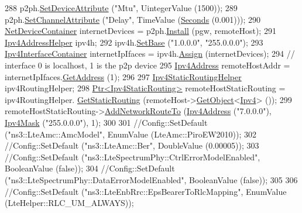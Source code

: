\begin{DoxyCode}
288   p2ph.\hyperlink{classns3_1_1PointToPointHelper_a4577f5ab8c387e5528af2e0fbab1152e}{SetDeviceAttribute} (\textcolor{stringliteral}{"Mtu"}, UintegerValue (1500));
289   p2ph.\hyperlink{classns3_1_1PointToPointHelper_a6b5317fd17fb61e5a53f8d66a90b63b9}{SetChannelAttribute} (\textcolor{stringliteral}{"Delay"}, TimeValue (\hyperlink{group__timecivil_ga33c34b816f8ff6628e33d5c8e9713b9e}{Seconds} (0.001)));
290   \hyperlink{classns3_1_1NetDeviceContainer}{NetDeviceContainer} internetDevices = p2ph.\hyperlink{classns3_1_1PointToPointHelper_ab9162fea3e88722666fed1106df1f9ec}{Install} (pgw, remoteHost);
291   \hyperlink{classns3_1_1Ipv4AddressHelper}{Ipv4AddressHelper} ipv4h;
292   ipv4h.\hyperlink{classns3_1_1Ipv4AddressHelper_acf7b16dd25bac67e00f5e25f90a9a035}{SetBase} (\textcolor{stringliteral}{"1.0.0.0"}, \textcolor{stringliteral}{"255.0.0.0"});
293   \hyperlink{classns3_1_1Ipv4InterfaceContainer}{Ipv4InterfaceContainer} internetIpIfaces = ipv4h.\hyperlink{classns3_1_1Ipv4AddressHelper_af8e7f4a1a7e74c00014a1eac445a27af}{Assign} (internetDevices);
294   \textcolor{comment}{// interface 0 is localhost, 1 is the p2p device}
295   \hyperlink{classns3_1_1Ipv4Address}{Ipv4Address} remoteHostAddr = internetIpIfaces.\hyperlink{classns3_1_1Ipv4InterfaceContainer_ae63208dcd222be986822937ee4aa828c}{GetAddress} (1);
296 
297   \hyperlink{classns3_1_1Ipv4StaticRoutingHelper}{Ipv4StaticRoutingHelper} ipv4RoutingHelper;
298   \hyperlink{classns3_1_1Ptr}{Ptr<Ipv4StaticRouting>} remoteHostStaticRouting = ipv4RoutingHelper.
      \hyperlink{classns3_1_1Ipv4StaticRoutingHelper_a731206e50d305695dac7fb2ef963a4bb}{GetStaticRouting} (remoteHost->\hyperlink{classns3_1_1Object_a13e18c00017096c8381eb651d5bd0783}{GetObject}<\hyperlink{classns3_1_1Ipv4}{Ipv4}> ());
299   remoteHostStaticRouting->\hyperlink{classns3_1_1Ipv4StaticRouting_a8bf5eaa7ba49fe33c78c70d5560b6c39}{AddNetworkRouteTo} (\hyperlink{classns3_1_1Ipv4Address}{Ipv4Address} (\textcolor{stringliteral}{"7.0.0.0"}), 
      \hyperlink{classns3_1_1Ipv4Mask}{Ipv4Mask} (\textcolor{stringliteral}{"255.0.0.0"}), 1);
300 
301   \textcolor{comment}{//Config::SetDefault ("ns3::LteAmc::AmcModel", EnumValue (LteAmc::PiroEW2010));}
302   \textcolor{comment}{//Config::SetDefault ("ns3::LteAmc::Ber", DoubleValue (0.00005));}
303   \textcolor{comment}{//Config::SetDefault ("ns3::LteSpectrumPhy::CtrlErrorModelEnabled", BooleanValue (false));}
304   \textcolor{comment}{//Config::SetDefault ("ns3::LteSpectrumPhy::DataErrorModelEnabled", BooleanValue (false));}
305 
306   \textcolor{comment}{//Config::SetDefault ("ns3::LteEnbRrc::EpsBearerToRlcMapping", EnumValue (LteHelper::RLC\_UM\_ALWAYS));}

\end{DoxyCode}
